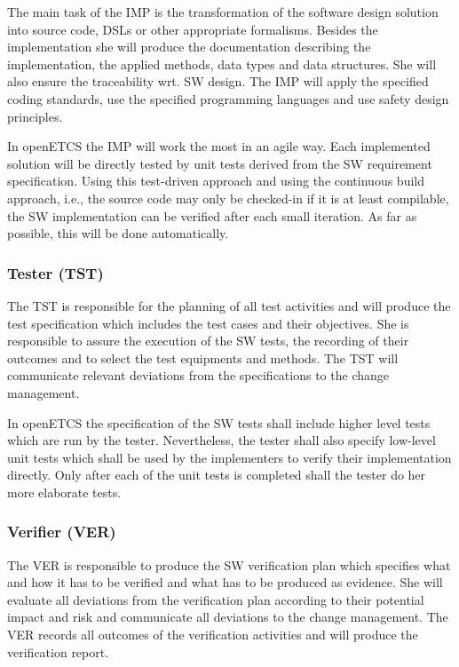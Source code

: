 The main task of the IMP is the transformation of the software design solution
into source code, DSLs or other appropriate formalisms. Besides the
implementation she will produce the documentation describing the implementation,
the applied methods, data types and data structures. She will also ensure the
traceability wrt. SW design. The IMP will apply the specified coding standards,
use the specified programming languages and use safety design principles.

In openETCS the IMP will work the most in an agile way. Each implemented
solution will be directly tested by unit tests derived from the SW requirement
specification. Using this test-driven approach and using the continuous build
approach, i.e., the source code may only be checked-in if it is at least
compilable, the SW implementation can be verified after each small iteration. As
far as possible, this will be done automatically.

\subsubsection{Tester (TST)}
\label{sec:tester}

The TST is responsible for the planning of all test activities and will produce
the test specification which includes the test cases and their objectives. She
is responsible to assure the execution of the SW tests, the recording of their
outcomes and to select the test equipments and methods. The TST will communicate
relevant deviations from the specifications to the change management.

In openETCS the specification of the SW tests shall include higher level tests
which are run by the tester. Nevertheless, the tester shall also specify
low-level unit tests which shall be used by the implementers to verify their
implementation directly. Only after each of the unit tests is completed shall
the tester do her more elaborate tests.

\subsubsection{Verifier (VER)}
\label{sec:verifier}

The VER is responsible to produce the SW verification plan which specifies what
and how it has to be verified and what has to be produced as evidence. She will
evaluate all deviations from the verification plan according to their potential
impact and risk and communicate all deviations to the change management. The VER
records all outcomes of the verification activities and will produce the
verification report.

